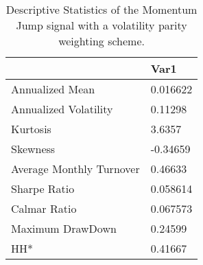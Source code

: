 \begin{table}[H]
\centering
\begin{tabular}{ll}
& Var1 \\ 
\hline 
Annualized Mean & 0.016622 \\ 
Annualized Volatility & 0.11298 \\ 
Kurtosis & 3.6357 \\ 
Skewness & -0.34659 \\ 
Average Monthly Turnover & 0.46633 \\ 
Sharpe Ratio & 0.058614 \\ 
Calmar Ratio & 0.067573 \\ 
Maximum DrawDown & 0.24599 \\ 
HH* & 0.41667 \\ 
\hline
\end{tabular}
\caption{Descriptive Statistics of the Momentum Jump signal with a volatility parity weighting scheme.}
\label{MOMJUMPVP}
\end{table}
